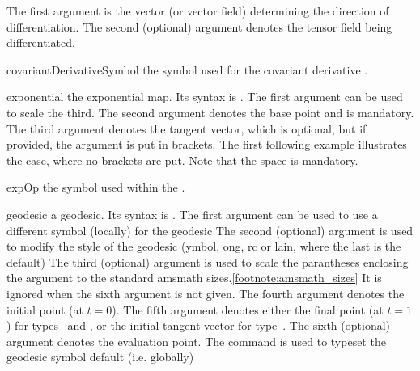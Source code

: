 \documentclass[english,a4paper,DIV=12,parskip=full,oneside]{scrartcl}
\begin{document}
\begin{commandlist}
		The first argument is the vector (or vector field) determining the direction of differentiation.
		The second (optional) argument denotes the tensor field being differentiated.
		\par{}
	\item[covariantDerivativeSymbol]\hspace{4em}the symbol used for the covariant derivative \codeCommand{\covariantDerivative}.
		\par\mathCodeExample{\covariantDerivativeSymbol}
	\item[exponential] the exponential map.
		Its syntax is .
		The first argument can be used to scale the third.
		The second argument denotes the base point and is mandatory.
		The third argument denotes the tangent vector, which is optional, but if provided, the argument is put in brackets.
		The first following example illustrates the case, where no brackets are put.
		Note that the space is mandatory.
		\par{}
		\par{}
		\par{}
	\item[expOp] the symbol used within the \codeCommand{\exponential}.
		\par\mathCodeExample{\expOp}
	\item[geodesic] a geodesic.
		Its syntax is .%
		The first argument can be used to use a different symbol (locally) for the geodesic
		The second (optional) argument is used to modify the style of the geodesic (ymbol, ong, rc or lain, where the last is the default)
		The third (optional) argument is used to scale the parantheses enclosing the argument to the standard amsmath sizes.\cref{footnote:amsmath_sizes}
		It is ignored when the sixth argument is not given.
		The fourth argument denotes the initial point (at $t = 0$).
		The fifth argument denotes either the final point (at $t = 1$) for types~ and , or the initial tangent vector for type~.
		The sixth (optional) argument denotes the evaluation point.
		The command \codeCommand{\geodesicSymbol} is used to typeset the geodesic symbol default (i.e. globally)

\end{commandlist}
\end{document}
